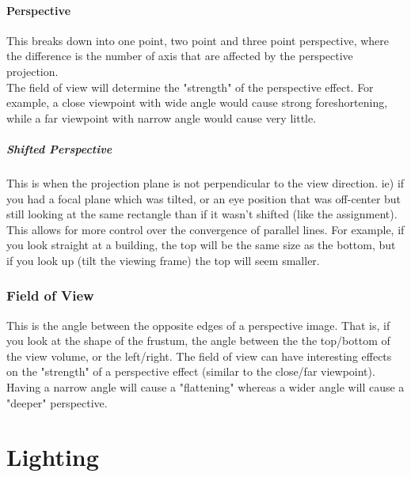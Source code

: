 \documentclass[12pt]{article}
\theoremstyle{definition}
\begin{document}
\subsection{Perspective}
This breaks down into one point, two point and three point perspective, where the difference is the number of axis that are affected by the perspective projection.
\\ \linebreak
The field of view will determine the "strength" of the perspective effect. For example, a close viewpoint with wide angle would cause strong foreshortening, while a far viewpoint with narrow angle would cause very little.
\subsubsection{Shifted Perspective}
This is when the projection plane is not perpendicular to the view direction. ie) if you had a focal plane which was tilted, or an eye position that was off-center but still looking at the same rectangle than if it wasn't shifted (like the assignment).
\\ \linebreak
This allows for more control over the convergence of parallel lines. For example, if you look straight at a building, the top will be the same size as the bottom, but if you look up (tilt the viewing frame) the top will seem smaller.

\section{Field of View}
This is the angle between the opposite edges of a perspective image. That is, if you look at the shape of the frustum, the angle between the the top/bottom of the view volume, or the left/right. The field of view can have interesting effects on the "strength" of a perspective effect (similar to the close/far viewpoint). Having a narrow angle will cause a "flattening" whereas a wider angle will cause a "deeper" perspective.

\part{Lighting}

\section{}
\end{document}
